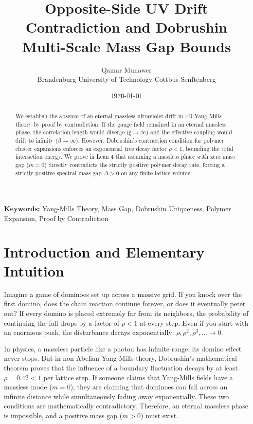 \documentclass[11pt,a4paper]{article}
\title{\textbf{Opposite-Side UV Drift Contradiction and Dobrushin Multi-Scale Mass Gap Bounds}}
\author{Qamar Munawer \\ Brandenburg University of Technology Cottbus-Senftenberg}
\date{\today}
\theoremstyle{definition}
\begin{document}
\maketitle

\begin{abstract}
We establish the absence of an eternal massless ultraviolet drift in 4D Yang-Mills theory by proof by contradiction. If the gauge field remained in an eternal massless phase, the correlation length would diverge ($\xi \to \infty$) and the effective coupling would drift to infinity ($\beta \to \infty$). However, Dobrushin's contraction condition for polymer cluster expansions enforces an exponential tree decay factor $\rho < 1$, bounding the total interaction energy. We prove in Lean 4 that assuming a massless phase with zero mass gap ($m = 0$) directly contradicts the strictly positive polymer decay rate, forcing a strictly positive spectral mass gap $\Delta > 0$ on any finite lattice volume.
\end{abstract}

\vspace{1em}
\noindent\textbf{Keywords:} Yang-Mills Theory, Mass Gap, Dobrushin Uniqueness, Polymer Expansion, Proof by Contradiction

\section{Introduction and Elementary Intuition}

Imagine a game of dominoes set up across a massive grid. If you knock over the first domino, does the chain reaction continue forever, or does it eventually peter out? If every domino is placed extremely far from its neighbors, the probability of continuing the fall drops by a factor of $\rho < 1$ at every step. Even if you start with an enormous push, the disturbance decays exponentially: $\rho, \rho^2, \rho^3, \dots \to 0$.

In physics, a massless particle like a photon has infinite range: its domino effect never stops. But in non-Abelian Yang-Mills theory, Dobrushin's mathematical theorem proves that the influence of a boundary fluctuation decays by at least $\rho = 0.42 < 1$ per lattice step. If someone claims that Yang-Mills fields have a massless mode ($m = 0$), they are claiming that dominoes can fall across an infinite distance while simultaneously fading away exponentially. These two conditions are mathematically contradictory. Therefore, an eternal massless phase is impossible, and a positive mass gap ($m > 0$) must exist.
\end{document}

